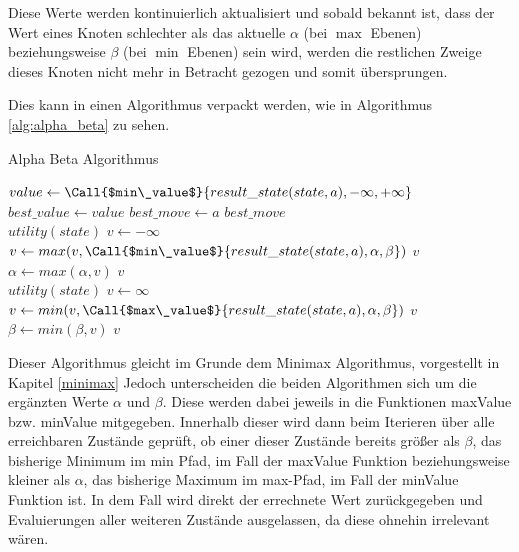 Diese Werte werden kontinuierlich aktualisiert und sobald bekannt ist, dass der Wert eines Knoten schlechter als das aktuelle $\alpha$ (bei $\max$ Ebenen) beziehungsweise $\beta$ (bei $\min$ Ebenen) sein wird, werden die restlichen Zweige dieses Knoten nicht mehr in Betracht gezogen und somit übersprungen. \cite{Russell2010}

Dies kann in einen Algorithmus verpackt werden, wie in Algorithmus \ref{alg:alpha_beta} zu sehen.

\begin{algorithm}[p]
\caption{Alpha Beta Algorithmus \cite{Russell2010}}
\label{alg:alpha_beta}
\begin{algorithmic}
		\State $value \gets \Call{$min\_value$}{result\_state(state, a), -\infty, +\infty}$
			\State $best\_value \gets value$
			\State $best\_move \gets a$
		\EndIf
	\EndFor
	\State \Return $best\_move$
\EndFunction
\\
	 \State \Return $utility(state)$ \EndIf
	\State $v \gets -\infty$
		\State $v \gets max(v, \Call{$min\_value$}{result\_state(state, a), \alpha, \beta})$
		 \State \Return $v$ \EndIf
		\State $\alpha \gets max(\alpha, v)$
	\EndFor
	\State \Return $v$
\EndFunction
\\
	 \State \Return $utility(state)$ \EndIf
	\State $v \gets \infty$
		\State $v \gets min(v, \Call{$max\_value$}{result\_state(state, a), \alpha, \beta})$
		 \State \Return $v$ \EndIf
		\State $\beta \gets min(\beta, v)$
	\EndFor
	\State \Return $v$
\EndFunction
\end{algorithmic}
\end{algorithm}

Dieser Algorithmus gleicht im Grunde dem Minimax Algorithmus, vorgestellt in Kapitel \ref{minimax} Jedoch unterscheiden die beiden Algorithmen sich um die ergänzten Werte $\alpha$ und $\beta$. Diese werden dabei jeweils in die Funktionen maxValue bzw. minValue mitgegeben. Innerhalb dieser wird dann beim Iterieren über alle erreichbaren Zustände geprüft, ob einer dieser Zustände bereits größer als $\beta$, das bisherige Minimum im min Pfad, im Fall der maxValue Funktion beziehungsweise kleiner als $\alpha$, das bisherige Maximum im max-Pfad, im Fall der minValue Funktion ist. In dem Fall wird direkt der errechnete Wert zurückgegeben und Evaluierungen aller weiteren Zustände ausgelassen, da diese ohnehin irrelevant wären.

